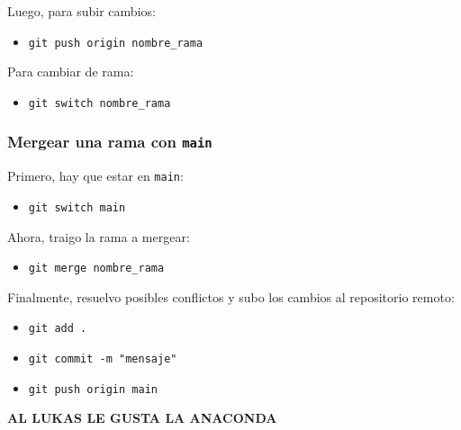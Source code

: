 \documentclass{article} %
\begin{document}
Luego, para subir cambios:

\begin{itemize}
    \item \texttt{git push origin nombre\_rama}
\end{itemize}

Para cambiar de rama:

\begin{itemize}
    \item \texttt{git switch nombre\_rama}
\end{itemize}

\subsubsection{Mergear una rama con \texttt{main}}

Primero, hay que estar en \texttt{main}:

\begin{itemize}
    \item \texttt{git switch main}
\end{itemize}

Ahora, traigo la rama a mergear:

\begin{itemize}
    \item \texttt{git merge nombre\_rama}
\end{itemize}

Finalmente, resuelvo posibles conflictos y subo los cambios al repositorio remoto:

\begin{itemize}
    \item \texttt{git add .}
    \item \texttt{git commit -m "mensaje"}
    \item \texttt{git push origin main}
\end{itemize}

\huge\textbf{AL LUKAS LE GUSTA LA ANACONDA}
\end{document}
